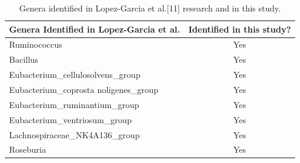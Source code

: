 \documentclass{singlecol-new}
\theoremstyle{TH}{
\newtheorem{lemma}{Lemma}
\newtheorem{theorem}[lemma]{Theorem}
\newtheorem{corrolary}[lemma]{Corrolary}
\newtheorem{conjecture}[lemma]{Conjecture}
\newtheorem{proposition}[lemma]{Proposition}
\newtheorem{claim}[lemma]{Claim}
\newtheorem{stheorem}[lemma]{Wrong Theorem}
\newtheorem{algorithm}{Algorithm}
}
\theoremstyle{THrm}{
\newtheorem{definition}{Definition}[section]
\newtheorem{question}{Question}[section]
\newtheorem{remark}{Remark}
\newtheorem{scheme}{Scheme}
}
\theoremstyle{THhit}{
\newtheorem{case}{Case}[section]
}
\begin{document}
\begin{table}[htbp]
\caption{Genera identified in Lopez-Garcia et al.[11] research and in this study.}
\begin{center}
\begin{tabular}{|c|c|}
\hline
\multicolumn{1}{|c|}{\textbf{Genera Identified in Lopez-Garcia et al.}} 
& \textbf{Identified in this study?} \\ \hline
\multicolumn{1}{|l|}{Ruminococcus}                           & \multicolumn{1}{c|}{Yes} \\ \hline
\multicolumn{1}{|l|}{Bacillus}                               & \multicolumn{1}{c|}{Yes} \\ \hline
\multicolumn{1}{|l|}{Eubacterium\_cellulosolvens\_group}     & \multicolumn{1}{c|}{Yes} \\ \hline
\multicolumn{1}{|l|}{Eubacterium\_coprosta noligenes\_group} & \multicolumn{1}{c|}{Yes} \\ \hline
\multicolumn{1}{|l|}{Eubacterium\_ruminantium\_group}        & \multicolumn{1}{c|}{Yes} \\ \hline
\multicolumn{1}{|l|}{Eubacterium\_ventriosum\_group}         & \multicolumn{1}{c|}{Yes} \\ \hline
\multicolumn{1}{|l|}{Lachnospiraceae\_NK4A136\_group}        & \multicolumn{1}{c|}{Yes} \\ \hline
\multicolumn{1}{|l|}{Roseburia}                              & \multicolumn{1}{c|}{Yes} \\ \hline                                   
\end{tabular}
\label{tab1}
\end{center}
\end{table}
\end{document}
